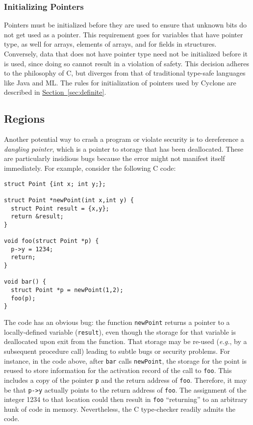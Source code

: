 \subsubsection*{Initializing Pointers}

Pointers must be initialized before they are used to ensure that unknown
bits do not get used as a pointer.  This requirement goes for
variables that have pointer type, as well for arrays, elements of arrays,
and for fields in structures.  Conversely, data that does not have pointer
type need not be initialized before it is used, since doing so cannot result
in a violation of safety.  This decision adheres to the philosophy of C, but
diverges from that of traditional type-safe languages like Java and
ML.  The rules for initialization of pointers used by Cyclone are
described in \hyperref[{sec:definite}]{Section~\ref{sec:definite}}.

\subsection{Regions}
\label{sec:tut-regions}

Another potential way to crash a program or violate security is
to dereference a \emph{dangling pointer}, which is a pointer to storage that
has been deallocated.  These are particularly insidious bugs
because the error might not manifest itself immediately.  
For example, consider the following C code:
\begin{verbatim}
struct Point {int x; int y;};

struct Point *newPoint(int x,int y) {
  struct Point result = {x,y};
  return &result;
}

void foo(struct Point *p) {
  p->y = 1234;
  return;
}

void bar() {
  struct Point *p = newPoint(1,2);
  foo(p);
}
\end{verbatim}
The code has an obvious bug: the function \texttt{newPoint} returns a
pointer to a locally-defined variable (\texttt{result}), even though
the storage for that variable is deallocated upon exit from the
function.  That storage may be re-used (\emph{e.g.}, by a subsequent procedure
call) leading to subtle bugs or security problems.  For instance, in
the code above, after \texttt{bar} calls \texttt{newPoint}, the storage
for the point is reused to store information for the activation
record of the call to \texttt{foo}.  This includes a copy of the
pointer \texttt{p} and the return address of \texttt{foo}.  Therefore,
it may be that \texttt{p->y} actually points to the return address of
\texttt{foo}. The assignment of the integer 1234 to that location could
then result in \texttt{foo} ``returning'' to an arbitrary hunk of code
in memory.  Nevertheless, the C type-checker readily
admits the code.

